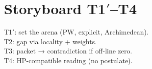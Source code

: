 \section{\texorpdfstring{Storyboard T1$′$–T4}{Storyboard T1′–T4}}
T1$′$: set the arena (PW, explicit, Archimedean).\\
T2: gap via locality + weights. \\
T3: packet → contradiction if off-line zero. \\
T4: HP-compatible reading (no postulate).
